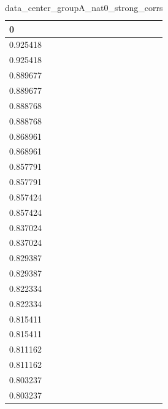\begin{table}
\caption{data_center_groupA_nat0_strong_corrs}
\label{tab:data_summary}
\begin{tabular}{lcr}
\toprule
0 \\
\midrule
0.925418 \\
0.925418 \\
0.889677 \\
0.889677 \\
0.888768 \\
0.888768 \\
0.868961 \\
0.868961 \\
0.857791 \\
0.857791 \\
0.857424 \\
0.857424 \\
0.837024 \\
0.837024 \\
0.829387 \\
0.829387 \\
0.822334 \\
0.822334 \\
0.815411 \\
0.815411 \\
0.811162 \\
0.811162 \\
0.803237 \\
0.803237 \\
\bottomrule
\end{tabular}
\end{table}
